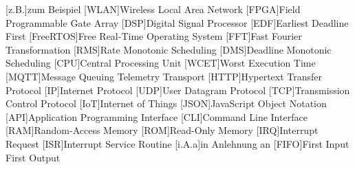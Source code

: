 \documentclass[../EDF Master Thesis.tex]{subfiles}
\begin{document}
    \begin{acronym}[abkuerzungen]
        [z.B.]{zum Beispiel}
        [WLAN]{Wireless Local Area Network}
        [FPGA]{Field Programmable Gate Array}
        [DSP]{Digital Signal Processor}
        [EDF]{Earliest Deadline First}
        [FreeRTOS]{Free Real-Time Operating System}
        [FFT]{Fast Fourier Transformation}
        [RMS]{Rate Monotonic Scheduling}
        [DMS]{Deadline Monotonic Scheduling}
        [CPU]{Central Processing Unit}
        [WCET]{Worst Execution Time}
        [MQTT]{Message Queuing Telemetry Transport}
        [HTTP]{Hypertext Transfer Protocol}
        [IP]{Internet Protocol}
        [UDP]{User Datagram Protocol}
        [TCP]{Transmission Control Protocol}
        [IoT]{Internet of Things}
        [JSON]{JavaScript Object Notation}
        [API]{Application Programming Interface}
        [CLI]{Command Line Interface}
        [RAM]{Random-Access Memory}
        [ROM]{Read-Only Memory}
        [IRQ]{Interrupt Request}
        [ISR]{Interrupt Service Routine}
        [i.A.a]{in Anlehnung an}
        [FIFO]{First Input First Output}
	\end{acronym}
\end{document}
